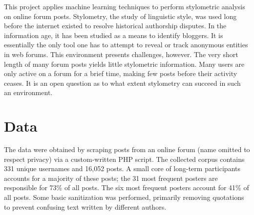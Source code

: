 \documentclass[12pt,letterpaper,onecolumn,oneside]{article}
\numberwithin{equation}{section}
\numberwithin{figure}{section}
\begin{document}
This project applies machine learning techniques to perform stylometric analysis on online forum posts. Stylometry, the study of linguistic style, was used long before the internet existed to resolve historical 
authorship disputes. In the information age, it has been studied as a means to identify bloggers. It is essentially the only tool one has to attempt to reveal or track anonymous entities in web forums. This 
environment presents challenges, however. The very short length of many forum posts yields little stylometric information. Many users are only active on a forum for a brief time, making few posts before their 
activity ceases. It is an open question as to what extent stylometry can succeed in such an environment.

\section{Data}
The data were obtained by scraping posts from an online forum (name omitted to respect privacy) via a custom-written PHP script. The collected corpus contains 331 unique usernames and 16,052 posts. A small core of 
long-term participants accounts for a majority of these posts; the 31 most frequent posters are responsible for 73\% of all posts. The six most frequent posters account for 41\% of all posts. Some basic 
sanitization was performed, primarily removing quotations to prevent confusing text written by different authors.
\end{document}
